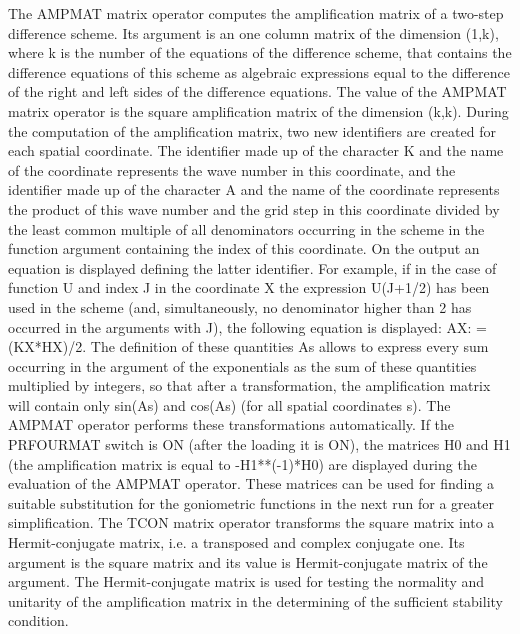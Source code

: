      The AMPMAT matrix operator computes the  amplification matrix  of a
two-step difference  scheme. Its argument is an one column matrix of the
dimension  (1,k),  where  k  is  the  number  of  the  equations  of the
difference scheme, that contains the difference equations of this scheme
as algebraic expressions equal to the difference of  the right  and left
sides  of  the  difference  equations.  The  value  of the AMPMAT matrix
operator is the square  amplification  matrix  of  the  dimension (k,k).
During the  computation of the amplification matrix, two new identifiers
are created for each spatial coordinate. The identifier  made up  of the
character K and the name of the coordinate represents the wave number in
this coordinate, and the identifier made up of  the character  A and the
name of  the coordinate  represents the  product of this wave number and
the grid step in this coordinate divided by the least common multiple of
all  denominators  occurring  in  the  scheme  in  the function argument
containing the index of this coordinate.  On the  output an  equation is
displayed defining the latter identifier. For example, if in the case of
function U and index J in the coordinate  X the  expression U(J+1/2) has
been used in the scheme (and, simultaneously, no denominator higher than
2 has occurred in the  arguments  with  J),  the  following  equation is
displayed: AX: = (KX*HX)/2. The definition of these quantities As allows
to express every sum occurring in  the argument  of the  exponentials as
the  sum  of  these  quantities  multiplied by integers, so that after a
transformation, the amplification matrix  will contain  only sin(As) and
cos(As) (for  all spatial  coordinates s).  The AMPMAT operator performs
these transformations  automatically.  If  the  PRFOURMAT  switch  is ON
(after the  loading it is ON), the matrices H0 and H1 (the amplification
matrix is equal to -H1**(-1)*H0) are displayed during  the evaluation of
the AMPMAT  operator. These  matrices can be used for finding a suitable
substitution for the goniometric functions in the next run for a greater
simplification.
     The  TCON  matrix  operator  transforms  the  square  matrix into a
Hermit-conjugate matrix,  i.e. a  transposed and  complex conjugate one.
Its argument  is the  square matrix  and its  value is  Hermit-conjugate
matrix of the argument. The Hermit-conjugate matrix is  used for testing
the  normality   and  unitarity  of  the  amplification  matrix  in  the
determining of the sufficient stability condition.




